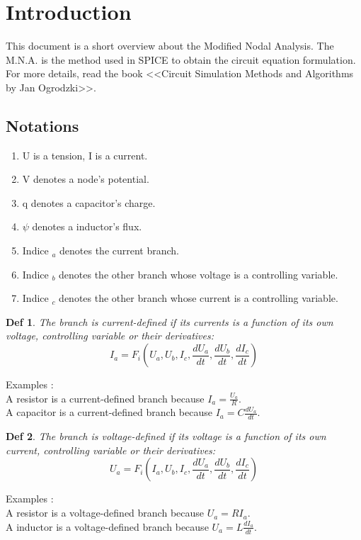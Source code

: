 \documentclass[10pt]{article}
\begin{document}
 
\section{Introduction\\}
This document is a short overview about the Modified Nodal Analysis. The M.N.A. is the method used
in SPICE to obtain the circuit equation formulation. For more details, read the book <<Circuit Simulation
Methods and Algorithms by Jan Ogrodzki>>.

\subsection{Notations}
\begin{enumerate}
  \item U is a tension, I is a current.
  \item V denotes a node's potential.
  \item q denotes a capacitor's charge.
  \item $\psi$ denotes a inductor's flux.
  \item Indice $_{a}$ denotes the current branch.
  \item Indice $_{b}$ denotes the other branch whose voltage is a controlling variable.
  \item Indice $_{c}$ denotes the other branch whose current is a controlling variable.
  \end{enumerate}

\newtheorem{mur}{Def}
\begin{mur}
The branch is current-defined if its currents is a function of its own voltage, controlling variable
or their derivatives:
\begin{equation}\label{CD}I_{a}=F_{i}(U_{a},U_{b},I_{c},\frac{dU_a}{dt},\frac{dU_b}{dt},\frac{dI_{c}}{dt})\end{equation}
\end{mur}
Examples : \\
A resistor is a current-defined branch because $I_{a}=\frac{U_{a}}{R}$.\\
A capacitor is a current-defined branch because $I_{a}=C\frac{dU_{a}}{dt}$.\\
\begin{mur}
The branch is voltage-defined if its voltage is a function of its own current, controlling variable
or their derivatives:
\begin{equation}\label{VD}U_{a}=F_{i}(I_{a},U_{b},I_{c},\frac{dU_a}{dt},\frac{dU_b}{dt},\frac{dI_{c}}{dt})\end{equation}
\end{mur}
Examples : \\
A resistor is a voltage-defined branch because $U_{a}=RI_{a}$.\\
A inductor is a voltage-defined branch because $U_{a}=L\frac{dI_{a}}{dt}$.\\
\end{document}
